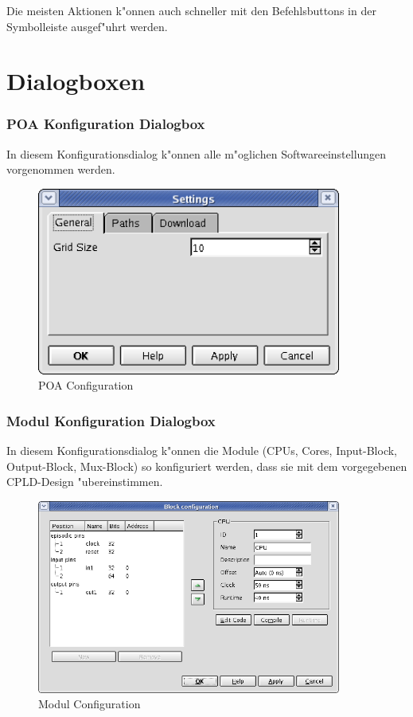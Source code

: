 \documentclass[a4paper,titlepage,12pt,ngerman]{scrbook}
\begin{document}
Die meisten Aktionen k"onnen auch schneller mit den Befehlsbuttons in der Symbolleiste ausgef"uhrt werden.
	
\section{Dialogboxen}

\subsubsection{POA Konfiguration Dialogbox}
In diesem Konfigurationsdialog k"onnen alle m"oglichen Softwareeinstellungen vorgenommen werden.
\begin{figure}[htbp]
\begin{center}
\includegraphics[width=10cm]{POAConfiguration1}
\caption{POA Configuration}\label{test}
\end{center}
\end{figure}

\subsubsection{Modul Konfiguration Dialogbox}
In diesem Konfigurationsdialog k"onnen die Module (CPUs, Cores, Input-Block,
Output-Block, Mux-Block) so konfiguriert werden, dass sie mit dem vorgegebenen
CPLD-Design "ubereinstimmen.
\begin{figure}[htbp]
\begin{center}
\includegraphics[width=10cm]{CPUConfiguration}
\caption{Modul Configuration}\label{test}
\end{center}
\end{figure}
\end{document}
